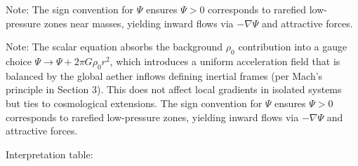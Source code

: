 \documentclass{article}
\begin{document}



Note: The sign convention for $\Psi$ ensures $\Psi > 0$ corresponds to rarefied low-pressure zones near masses, yielding inward flows via $-\nabla \Psi$ and attractive forces.

Note: The scalar equation absorbs the background $\rho_0$ contribution into a gauge choice $\Psi \to \Psi + 2\pi G \rho_0 r^2$, which introduces a uniform acceleration field that is balanced by the global aether inflows defining inertial frames (per Mach's principle in Section 3). This does not affect local gradients in isolated systems but ties to cosmological extensions. The sign convention for $\Psi$ ensures $\Psi > 0$ corresponds to rarefied low-pressure zones, yielding inward flows via $-\nabla \Psi$ and attractive forces.

Interpretation table:
\end{document}
